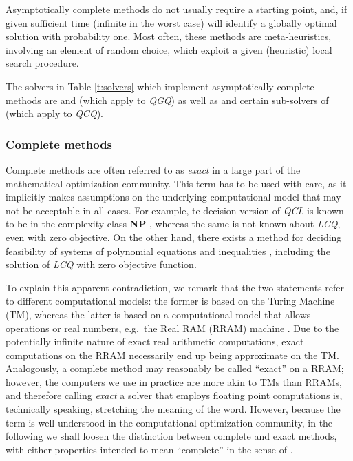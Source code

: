 Asymptotically complete methods do not usually require a starting point, and, if given sufficient time (infinite in the worst case) will identify a globally optimal solution with probability one. Most often, these methods are meta-heuristics, involving an element of random choice, which exploit a given (heuristic) local search procedure.

The solvers in Table \ref{t:solvers} which implement asymptotically complete methods are \oqnlp and \knitro (which apply to \textit{QGQ}) as well as \msnlp and certain sub-solvers of \lgo (which apply to \textit{QCQ}).


\subsubsection{Complete methods}\label{s:complete}

Complete methods are often referred to as \emph{exact} in a large part of the mathematical optimization community. This term has to be used with care, as it implicitly makes assumptions on the underlying computational model that may not be acceptable in all cases. For example, te decision version of \textit{QCL} is known to be in the complexity class \textbf{NP} \cite{vavasis90a}, whereas the same is not known about \textit{LCQ}, even with zero objective. On the other hand, there exists a method for deciding feasibility of systems of polynomial equations and inequalities \cite{tarski-reals}, including the solution of \textit{LCQ} with zero objective function.

To explain this apparent contradiction, we remark that the two statements refer to different computational models: the former is based on the Turing Machine (TM), whereas the latter is based on a computational model that allows operations or real numbers, e.g.~the Real RAM (RRAM) machine \cite{blum}. Due to the potentially infinite nature of exact real arithmetic computations, exact computations on the RRAM necessarily end up being approximate on the TM. Analogously, a complete method may reasonably be called ``exact'' on a RRAM; however, the computers we use in practice are more akin to TMs than RRAMs, and therefore calling \emph{exact} a solver that employs floating point computations is, technically speaking, stretching the meaning of the word. However, because the term is well understood in the computational optimization community, in the following we shall loosen the distinction between complete and exact methods, with either properties intended to mean ``complete'' in the sense of \cite{neumaier}.

